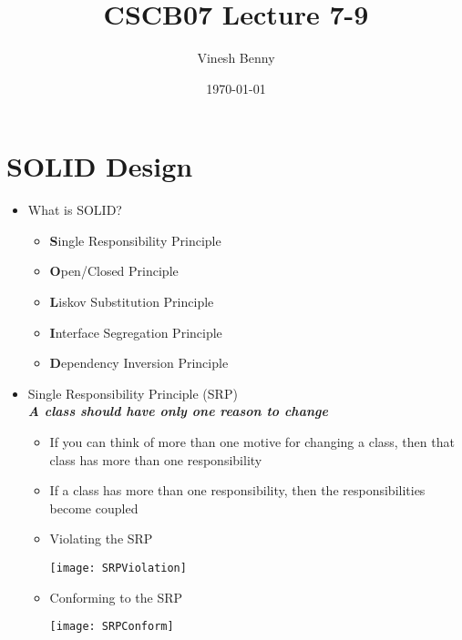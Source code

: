 \documentclass[11pt]{article}
\title{CSCB07 Lecture 7-9}
\author{Vinesh Benny}
\date{\today}
\begin{document}
\section{SOLID Design}

\begin{itemize}
	\item What is SOLID?
		\begin{itemize}
			\item \textbf{S}ingle Responsibility Principle
			\item \textbf{O}pen/Closed Principle
			\item \textbf{L}iskov Substitution Principle
			\item \textbf{I}nterface Segregation Principle
			\item \textbf{D}ependency Inversion Principle
		\end{itemize}

	\item Single Responsibility Principle (SRP)\\
		\textbf{\emph{A class should have only one reason to change}}
		\begin{itemize}
			\item If you can think of more than one motive for changing a class, then that class has more than one responsibility
			\item If a class has more than one responsibility, then the responsibilities become coupled
			\item Violating the SRP\\
				\begin{center}
					\texttt{[image: SRPViolation]}
				\end{center}
			\item Conforming to the SRP
				\begin{center}
					\texttt{[image: SRPConform]}
				\end{center}
		\end{itemize}


\end{itemize}
\end{document}
